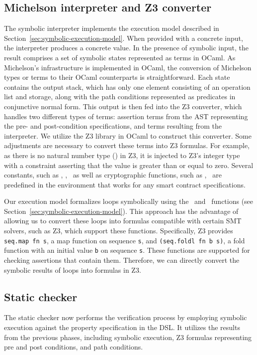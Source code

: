 \documentclass[a4paper,USenglish,cleveref, autoref,anonymous]{lipics-v2021}
\begin{document}
\subsection{Michelson interpreter and Z3 converter}
\label{sec:mich-interpr-z3}
The symbolic interpreter implements the execution model described in
Section~\ref{sec:symbolic-execution-model}. When provided with a
concrete input, the interpreter produces a concrete value. In the
presence of symbolic input, the result comprises a set of symbolic
states represented as terms in OCaml. As Michelson's infrastructure is
implemented in OCaml, the conversion of Michelson types or terms to
their OCaml counterparts is straightforward. Each state contains the
output stack, which has only one element consisting of an operation
list and storage, along with the path conditions represented as
predicates in conjunctive normal form. This output is then fed into
the Z3 converter, which handles two different types of terms:
assertion terms from the AST representing the pre- and post-condition
specifications, and terms resulting from the interpreter. We utilize
the Z3 library in OCaml to construct this converter. Some adjustments
are necessary to convert these terms into Z3 formulas. For example, as
there is no natural number type (\TNAT) in Z3, it is injected to Z3's
integer type with a constraint asserting that the value is greater
than or equal to zero. Several constants, such as \CAMOUNT, \CBALANCE,
\CSENDER\ as well as cryptographic functions, such as \FSHA,
\FHASHKEY\ are predefined in the environment that works for any smart
contract specifications. 

Our execution model formalizes loops symbolically using the \FOLD\ and
\FMAP\ functions (see
Section~\ref{sec:symbolic-execution-model}). This approach has the
advantage of allowing us to convert these loops into formulas
compatible with certain SMT solvers, such as Z3, which support these
functions. Specifically, Z3 provides \lstinline/seq.map fn s/, a map
function on sequence \lstinline/s/, and
\lstinline/(seq.foldl fn b s)/, a fold function with an initial value \lstinline/b/ on sequence
\lstinline/s/. These functions are supported for checking assertions
that contain them. Therefore, we can directly convert the symbolic
results of loops into formulas in Z3. 
\subsection{Static checker}
\label{sec:static-checker}
The static checker now performs the verification process by employing symbolic execution against the property specification in the DSL. It utilizes the results from the previous phases, including symbolic execution, Z3 formulas representing pre and post conditions, and path conditions. 
\end{document}
